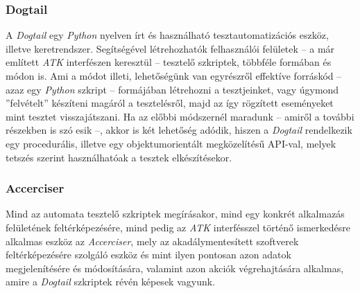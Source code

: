 \subsubsection{Dogtail}

A \textit{Dogtail} egy \textit{Python} nyelven írt és használható tesztautomatizációs eszköz, illetve keretrendszer. Segítségével létrehozhatók felhasználói felületek -- a már említett \textit{ATK} interfészen keresztül -- tesztelő szkriptek, többféle formában és módon is. Ami a módot illeti, lehetőségünk van egyrészről effektíve forráskód -- azaz egy \textit{Python} szkript -- formájában létrehozni a tesztjeinket, vagy úgymond ''felvételt'' készíteni magáról a tesztelésről, majd az így rögzített eseményeket mint tesztet visszajátszani. Ha az előbbi módszernél maradunk -- amiről a további részekben is szó esik --, akkor is két lehetőség adódik, hiszen a \textit{Dogtail} rendelkezik egy procedurális, illetve egy objektumorientált megközelítésű API-val, melyek tetszés szerint használhatóak a tesztek elkészítésekor.

\subsubsection{Accerciser}

Mind az automata tesztelő szkriptek megírásakor, mind egy konkrét alkalmazás felületének feltérképezésére, mind pedig az \textit{ATK} interfésszel történő ismerkedésre alkalmas eszköz az \textit{Accerciser}, mely az akadálymentesített szoftverek feltérképezésére szolgáló eszköz és mint ilyen pontosan azon adatok megjelenítésére és módosítására, valamint azon akciók végrehajtására alkalmas, amire a \textit{Dogtail} szkriptek révén képesek vagyunk.
